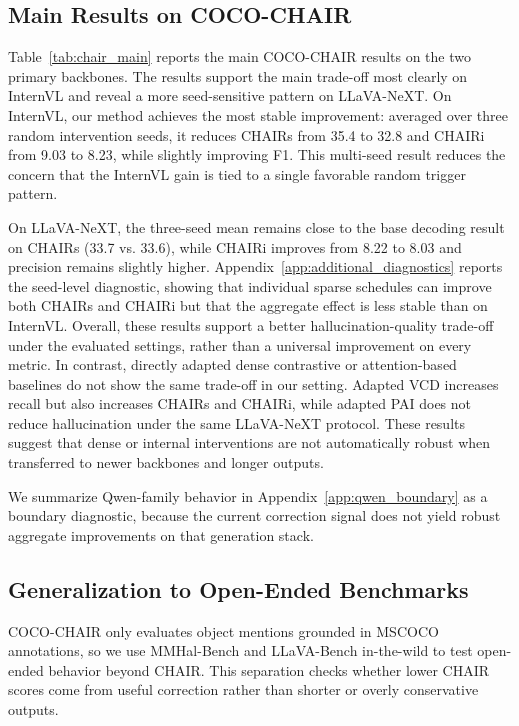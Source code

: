 \documentclass[11pt]{article}
\begin{document}
\subsection{Main Results on COCO-CHAIR}

  Table~\ref{tab:chair_main} reports the main COCO-CHAIR results on the two primary backbones.
  The results support the main trade-off most clearly on InternVL and reveal a more seed-sensitive pattern on LLaVA-NeXT.
  On InternVL, our method achieves the most stable improvement: averaged over three random intervention seeds, it reduces CHAIRs from 35.4 to 32.8 and CHAIRi from 9.03 to 8.23, while slightly improving F1.
  This multi-seed result reduces the concern that the InternVL gain is tied to a single favorable random trigger pattern.

  On LLaVA-NeXT, the three-seed mean remains close to the base decoding result on CHAIRs (33.7 vs. 33.6), while CHAIRi improves from 8.22 to 8.03 and precision remains slightly higher.
  Appendix~\ref{app:additional_diagnostics} reports the seed-level diagnostic, showing that individual sparse schedules can improve both CHAIRs and CHAIRi but that the aggregate effect is less stable than on InternVL.
  Overall, these results support a better hallucination-quality trade-off under the evaluated settings, rather than a universal improvement on every metric.
  In contrast, directly adapted dense contrastive or attention-based baselines do not show the same trade-off in our setting.
  Adapted VCD increases recall but also increases CHAIRs and CHAIRi, while adapted PAI does not reduce hallucination under the same LLaVA-NeXT protocol.
  These results suggest that dense or internal interventions are not automatically robust when transferred to newer backbones and longer outputs.

  We summarize Qwen-family behavior in Appendix~\ref{app:qwen_boundary} as a boundary diagnostic, because the current correction signal does not yield robust aggregate improvements on that generation stack.


 \subsection{Generalization to Open-Ended Benchmarks}

  COCO-CHAIR only evaluates object mentions grounded in MSCOCO annotations, so we use MMHal-Bench and LLaVA-Bench in-the-wild to test open-ended behavior beyond CHAIR.
  This separation checks whether lower CHAIR scores come from useful correction rather than shorter or overly conservative outputs.
\end{document}
